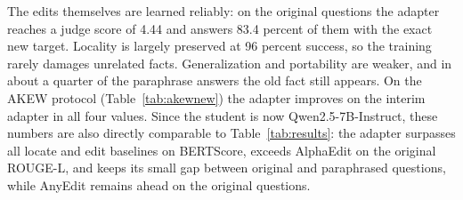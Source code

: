 \documentclass[10pt,a4paper]{article}
\begin{document}
The edits themselves are learned reliably: on the original questions the adapter reaches
a judge score of 4.44 and answers 83.4 percent of them with the exact new target.
Locality is largely preserved at 96 percent success, so the training rarely damages
unrelated facts. Generalization and portability are weaker, and in about a quarter of
the paraphrase answers the old fact still appears. On the AKEW protocol
(Table~\ref{tab:akewnew}) the adapter improves on the interim adapter in all four
values. Since the student is now Qwen2.5-7B-Instruct, these numbers are also directly
comparable to Table~\ref{tab:results}: the adapter surpasses all locate and edit baselines on
BERTScore, exceeds AlphaEdit on the original ROUGE-L, and keeps its small gap between
original and paraphrased questions, while AnyEdit remains ahead on the original
questions.

\begingroup
\footnotesize
\setlength{\bibsep}{2pt}


\endgroup
\end{document}

